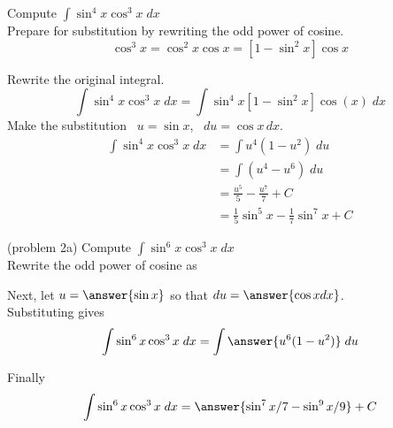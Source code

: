 \documentclass[handout]{ximera}
\begin{document}
\begin{example}[example 2]
Compute $\displaystyle{\int \sin^4 x\cos^3 x \; dx}$\\


Prepare for substitution by rewriting the odd power of cosine.
\[
\cos^3 x = \cos^2 x \cos x = \left[1 - \sin^2 x\right] \cos x
\]

Rewrite the original integral.
\[
\int \sin^4 x\cos^3 x \; dx = \int \sin^4 x\left[1 - \sin^2 x\right] \cos(x) \; dx
\]
Make the substitution \, $u = \sin x$,  \, $du = \cos x \, dx$.
\begin{align*}
\int \sin^4 x\cos^3 x \; dx &= \int u^4 (1-u^2) \; du\\
   &= \int (u^4 -u^6) \; du\\
  &= \frac{u^5}{5} - \frac{u^7}{7} + C \\
  &= \frac15 \sin^5 x - \frac17 \sin^7 x + C
\end{align*}
  
\end{example}



\begin{problem}(problem 2a)
Compute $\displaystyle{\int \sin^6 x\cos^3 x \; dx}$\\

Rewrite the odd power of cosine as

\begin{multipleChoice}
\end{multipleChoice}

Next, let $u = \answer{\sin x}$ so that $du = \answer{\cos x dx}$.\\

Substituting gives 
\[
\int \sin^6 x\cos^3 x \; dx= \int \answer{u^6(1-u^2)} \; du
\]

Finally 
\[
\int \sin^6 x\cos^3 x \; dx= \answer{\sin^7 x/7 -  \sin^9 x/9} + C
\]

\end{problem}
\end{document}
